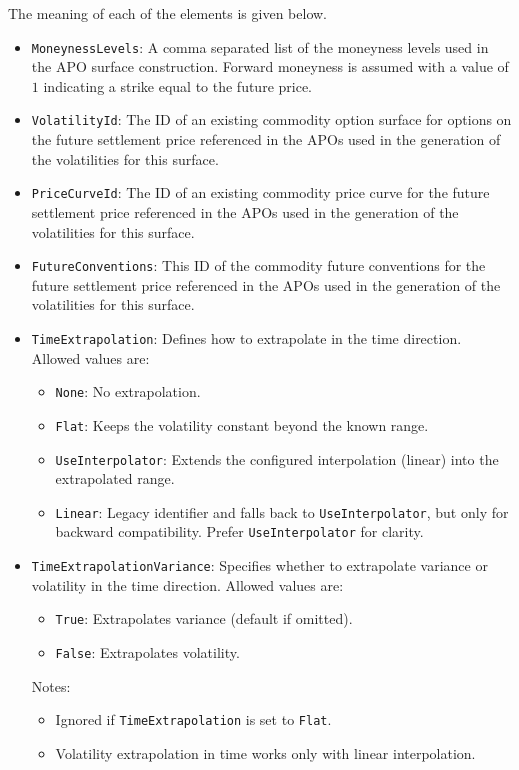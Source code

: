 The meaning of each of the elements is given below.
\begin{itemize}
\item \lstinline!MoneynessLevels!:
A comma separated list of the moneyness levels used in the APO surface construction. Forward moneyness is assumed with a value of $1$ indicating a strike equal to the future price.

\item \lstinline!VolatilityId!:
The ID of an existing commodity option surface for options on the future settlement price referenced in the APOs used in the generation of the volatilities for this surface.

\item \lstinline!PriceCurveId!:
The ID of an existing commodity price curve for the future settlement price referenced in the APOs used in the generation of the volatilities for this surface.

\item \lstinline!FutureConventions!:
This ID of the commodity future conventions for the future settlement price referenced in the APOs used in the generation of the volatilities for this surface.

\item \lstinline!TimeExtrapolation!:
Defines how to extrapolate in the time direction. Allowed values are:
  \begin{itemize}
    \item \lstinline!None!: No extrapolation.
    \item \lstinline!Flat!: Keeps the volatility constant beyond the known range.
    \item \lstinline!UseInterpolator!: Extends the configured interpolation (linear) into the extrapolated range.
    \item \lstinline!Linear!: Legacy identifier and falls back to \lstinline!UseInterpolator!, but only for backward compatibility. Prefer \lstinline!UseInterpolator! for clarity.
  \end{itemize}
  
\item \lstinline!TimeExtrapolationVariance!:
Specifies whether to extrapolate variance or volatility in the time direction. Allowed values are:
  \begin{itemize}
    \item \lstinline!True!: Extrapolates variance (default if omitted).
    \item \lstinline!False!: Extrapolates volatility.
  \end{itemize}
  Notes:
  \begin{itemize}
    \item Ignored if \lstinline!TimeExtrapolation! is set to \lstinline!Flat!.
    \item Volatility extrapolation in time works only with linear interpolation.
  \end{itemize}
  

\end{itemize}

